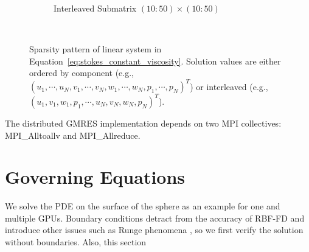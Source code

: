 \begin{figure}
\begin{subfigure}[b]{0.4\textwidth}
		\caption{Interleaved Submatrix $(10:50) \times (10:50)$}
		\label{fig:interleaved_stokes_zoom_dm}
	\end{subfigure} \\
\caption{Sparsity pattern of linear system in Equation~\ref{eq:stokes_constant_viscosity}. Solution values are either ordered by component (e.g., $( u_1, \cdots, u_N, v_1, \cdots, v_N, w_1, \cdots, w_N, p_1, \cdots, p_N)^T$) or interleaved (e.g., $( u_1, v_1, w_1, p_1,\cdots, u_N, v_N, w_N, p_N)^T$). }
\label{fig:interleaved_solution}
\end{figure} 


The distributed GMRES implementation depends on two MPI collectives: MPI\_Alltoallv and MPI\_Allreduce. 


\section{Governing Equations} 

We solve the PDE on the surface of the sphere as an example for one and multiple GPUs. Boundary conditions detract from the accuracy of RBF-FD and introduce other issues such as Runge phenomena \cite{RBFRungePaper}, so we first verify the solution without boundaries. Also, this section 




